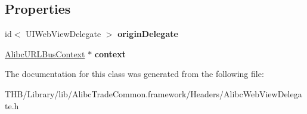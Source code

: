 \subsection*{Properties}
\begin{DoxyCompactItemize}
\item 
\mbox{\label{interface_alibc_web_view_delegate_ab9d9f631fbf917cb77c84a0ec5471664}} 
id$<$ U\+I\+Web\+View\+Delegate $>$ {\bfseries origin\+Delegate}
\item 
\mbox{\label{interface_alibc_web_view_delegate_a498ec886e47fd9feb4eb836c3eb5c522}} 
\mbox{\hyperlink{interface_alibc_u_r_l_bus_context}{Alibc\+U\+R\+L\+Bus\+Context}} $\ast$ {\bfseries context}
\end{DoxyCompactItemize}


The documentation for this class was generated from the following file\+:\begin{DoxyCompactItemize}
\item 
T\+H\+B/\+Library/lib/\+Alibc\+Trade\+Common.\+framework/\+Headers/Alibc\+Web\+View\+Delegate.\+h\end{DoxyCompactItemize}
